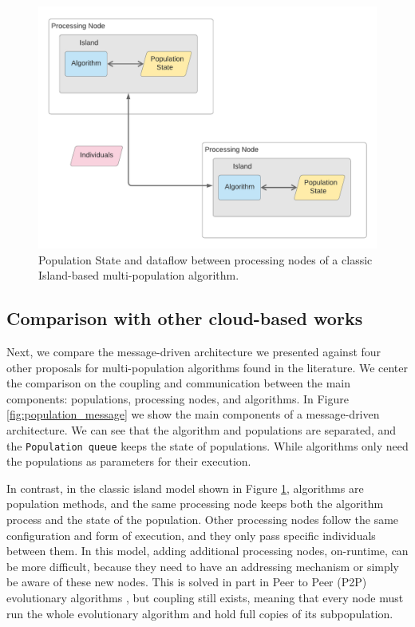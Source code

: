 \documentclass[review]{elsarticle}
\begin{document}
\begin{figure}[ht]
    \centering
    \includegraphics[width=\textwidth]{classicisland}
    \caption{ Population State and dataflow between processing nodes of a classic Island-based multi-population algorithm. }
    \label{fig:classicisland}
\end{figure}

\subsection{Comparison with other cloud-based works} 
\label{comparison}

Next, we compare the message-driven architecture we presented against four other
proposals for multi-population algorithms found in the literature. We center the
comparison on the coupling and communication between the main components:
populations, processing nodes, and algorithms.  In Figure \ref{fig:population_message} we show the
main components of a message-driven architecture. We can see that the algorithm
and populations are separated, and the \texttt{Population queue} keeps the state
of populations. While algorithms only need the populations as parameters
for their execution.


In contrast, in the classic island model shown in Figure
\ref{fig:classicisland}, algorithms are  population methods, and the same processing
node keeps both the algorithm process and the state of the population.  Other
processing nodes follow the same configuration and form of execution, and they
only pass specific individuals between them.  In this model, adding additional
processing nodes, on-runtime, can be more difficult, because they need to have
an addressing mechanism or simply be aware of these new nodes. This is
solved in part in Peer to Peer (P2P) evolutionary algorithms
\cite{juanlu:europar}, but coupling still exists, meaning that every
node must run the whole evolutionary algorithm and hold full copies of
its subpopulation. 
\end{document}
